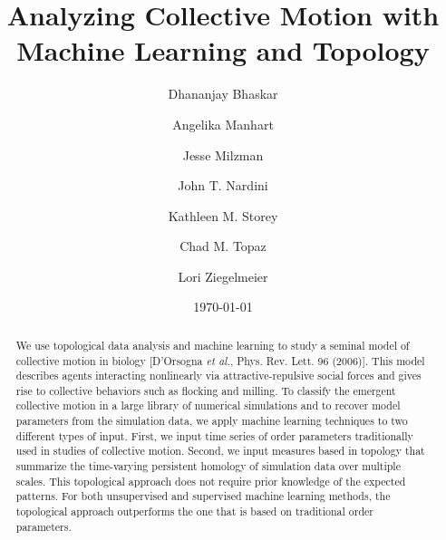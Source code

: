 \documentclass[%
 aip,
reprint,
 amsmath,amssymb,
 aps,
showkeys
]{revtex4-1}
\begin{document}

\title{Analyzing Collective Motion with Machine Learning and Topology}%

\author{Dhananjay Bhaskar}
%

\author{Angelika Manhart}
%

\author{Jesse Milzman}
%

\author{John T. Nardini}

\author{Kathleen M. Storey}
%


\author{Chad M. Topaz}
%

\author{Lori Ziegelmeier}
%

\date{\today}

\begin{abstract}

We use topological data analysis and machine learning to study a seminal model of collective motion in biology [D'Orsogna \emph{et al.}, Phys. Rev. Lett. 96 (2006)]. This model describes agents interacting nonlinearly via attractive-repulsive social forces and gives rise to collective behaviors such as flocking and milling. To classify the emergent collective motion in a large library of numerical simulations and to recover model parameters from the simulation data, we apply machine learning techniques to two different types of input. First, we input time series of order parameters traditionally used in studies of collective motion. Second, we input measures based in topology that summarize the time-varying persistent homology of simulation data over multiple scales. This topological approach does not require prior knowledge of the expected patterns. For both unsupervised and supervised machine learning methods, the topological approach outperforms the one that is based on traditional order parameters.
\end{abstract}
\end{document}
